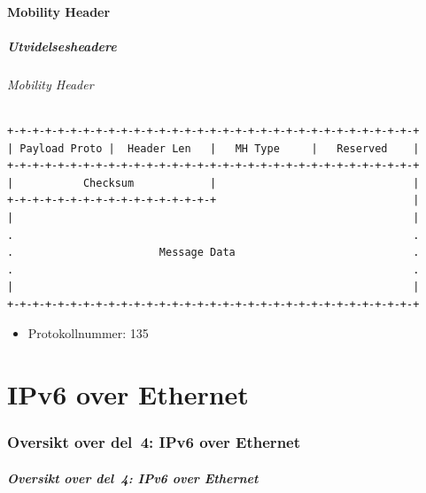 \subsection{Mobility Header}
\begin{frame}[fragile]%
  \frametitle{Utvidelsesheadere}
  \framesubtitle{Mobility Header}
\begin{Verbatim}[fontsize=\tiny]
+-+-+-+-+-+-+-+-+-+-+-+-+-+-+-+-+-+-+-+-+-+-+-+-+-+-+-+-+-+-+-+-+
| Payload Proto |  Header Len   |   MH Type     |   Reserved    |
+-+-+-+-+-+-+-+-+-+-+-+-+-+-+-+-+-+-+-+-+-+-+-+-+-+-+-+-+-+-+-+-+
|           Checksum            |                               |
+-+-+-+-+-+-+-+-+-+-+-+-+-+-+-+-+                               |
|                                                               |
.                                                               .
.                       Message Data                            .
.                                                               .
|                                                               |
+-+-+-+-+-+-+-+-+-+-+-+-+-+-+-+-+-+-+-+-+-+-+-+-+-+-+-+-+-+-+-+-+
\end{Verbatim}

  \begin{itemize}%
  \item Protokollnummer: 135
  \end{itemize}
\end{frame}

\part{IPv6 over Ethernet}

\begin{frame}
  \partpage
\end{frame}

\section*{Oversikt over del~4: IPv6 over Ethernet}
\begin{frame}[allowframebreaks]
  \frametitle{Oversikt over del~4: IPv6 over Ethernet}
    \tableofcontents%
\end{frame}


